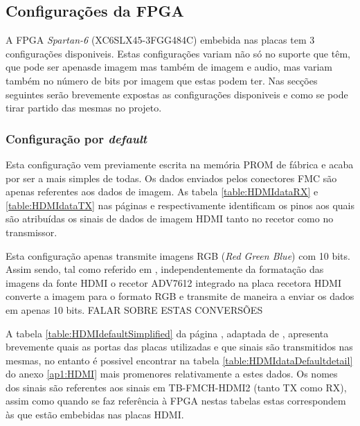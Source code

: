 \subsection{Configurações da FPGA} \label{subsec:HDMIconfig}

A FPGA \textit{Spartan-6} (XC6SLX45-3FGG484C) embebida nas placas tem 3 configurações disponiveis. Estas configurações variam não só no suporte que têm, que pode ser apenasde imagem mas também de imagem e audio, mas variam também no número de bits por imagem que estas podem ter. Nas secções seguintes serão brevemente expostas as configurações disponiveis e como se pode tirar partido das mesmas no projeto.


\subsubsection{Configuração por \textit{default}} \label{subsubsec:HDMIconfigdefault}

Esta configuração vem previamente escrita na memória PROM de fábrica e acaba por ser a mais simples de todas. Os dados enviados pelos conectores FMC são apenas referentes aos dados de imagem. As tabela \ref{table:HDMIdataRX} e \ref{table:HDMIdataTX} nas páginas \pageref{table:HDMIdataRX} e \pageref{table:HDMIdataTX} respectivamente identificam os pinos aos quais são atribuídas os sinais de dados de imagem HDMI tanto no recetor como no transmissor.

Esta configuração apenas transmite imagens RGB (\textit{Red Green Blue}) com 10 bits. Assim sendo, tal como referido em \cite{R009}, independentemente da formatação das imagens da fonte HDMI o recetor ADV7612 integrado na placa recetora HDMI converte a imagem para o formato RGB e transmite de maneira a enviar os dados em apenas 10 bits.  FALAR SOBRE ESTAS CONVERSÕES

A tabela \ref{table:HDMIdefaultSimplified} da página \pageref{table:HDMIdefaultSimplified}, adaptada de \cite{R009}, apresenta brevemente quais as portas das placas utilizadas e que sinais são transmitidos nas mesmas, no entanto é possivel encontrar na tabela \ref{table:HDMIdataDefaultdetail} do anexo \ref{ap1:HDMI} mais promenores relativamente a estes dados. Os nomes dos sinais são referentes aos sinais em TB-FMCH-HDMI2 (tanto TX como RX), assim como quando se faz referência à FPGA nestas tabelas estas correspondem às que estão embebidas nas placas HDMI. 

